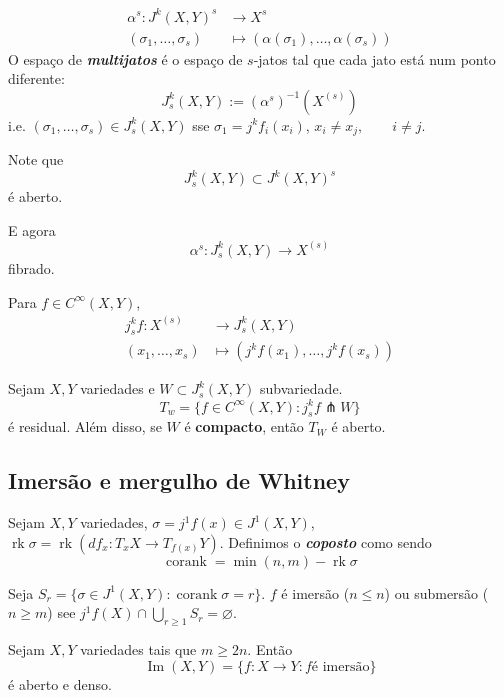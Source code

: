 \begin{align*}
	\alpha^s: J^k(X,Y)^s &\longrightarrow X^s \\
	(\sigma_1,\ldots,\sigma_s) &\longmapsto (\alpha(\sigma_1),\ldots,\alpha(\sigma_s))
\end{align*}
O espaço de \textit{\textbf{multijatos}} é o espaço de $s$-jatos tal que cada jato está num ponto diferente:
\[J^k_s(X,Y):=(\alpha^s)^{-1}(X^{(s)})\]
i.e. \((\sigma_1,\ldots,\sigma_s) \in J^k_s(X,Y)\) sse \(\sigma_1=j^kf_i(x_i)\), \(x_i \neq  x_j, \qquad  i \neq  j\).

Note que
\[J^k_s(X,Y) \subset J^k(X,Y)^s\]
é aberto.

E agora
\[\alpha^s: J^k_s(X,Y) \to X^{(s)}\]
fibrado.

Para \(f \in C^\infty (X,Y)\),
\begin{align*}
	j^k_sf: X^{(s)} &\longrightarrow J^k_s(X,Y) \\
	(x_1,\ldots,x_s) &\longmapsto (j^kf(x_1),\ldots,j^kf(x_s))
\end{align*}

\begin{thm}\leavevmode
Sejam \(X,Y\) variedades e \(W \subset J^k_s(X,Y)\) subvariedade.
\[T_w=\{ f \in C^\infty (X,Y):j^k_sf \pitchfork W\}\]
é residual. Além disso, se \(W\) é \textbf{compacto}, então \(T_W\) é aberto.
\end{thm}

\subsection{Imersão e mergulho de Whitney}

Sejam \(X, Y\) variedades, \(\sigma = j^1f(x) \in J^1(X,Y)\), \(\operatorname{rk}\sigma=\operatorname{rk}(df_x:T_xX \to T_{f(x)}Y)\). Definimos o \textit{\textbf{coposto}} como sendo
\[\operatorname{corank}=\operatorname{min}(n,m)-\operatorname{rk}\sigma\]
\begin{lemma}\leavevmode
Seja \(S_r=\{\sigma \in J^1(X,Y): \operatorname{corank}\sigma=r\}\). $f$ é imersão (\(n\leq n\)) ou submersão ( \(n \geq m\)) see \(j^1f(X) \cap \bigcup_{r \geq  1}S_r= \varnothing\).
\end{lemma}

\begin{thm}\leavevmode
Sejam \(X,Y\) variedades tais que \(m \geq  2n\). Então
\[\operatorname{Im}(X,Y)= \{ f: X \to Y: f \text{é imersão} \}\]
é aberto e denso.
\end{thm}

